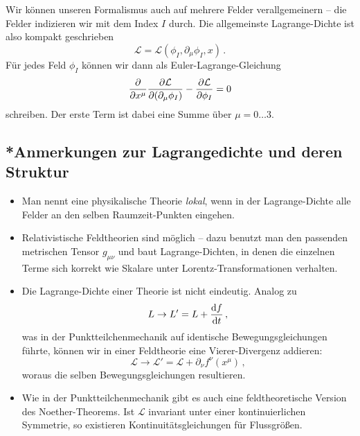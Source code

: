 \documentclass[paper=a4, fontsize=11.0pt, abstractoff, DIV12]{scrartcl}
\newcommand{\LD}{\ensuremath{\mathcal{L}}}
\begin{document}
Wir können unseren Formalismus auch auf mehrere Felder verallgemeinern --
die Felder indizieren wir mit dem Index $I$ durch. Die allgemeinste
Lagrange-Dichte ist also kompakt geschrieben
\begin{equation}
\LD = \LD(\phi_I, \partial_\mu\phi_I, x)\,.
\end{equation}
Für jedes Feld $\phi_I$ können wir dann als Euler-Lagrange-Gleichung
\begin{equation}
\firstpderiv{}{x^\mu}\firstpderiv{\LD}{(\partial_\mu\phi_I)} - \firstpderiv{\LD}{\phi_I} = 0
\end{equation}
schreiben. Der erste Term ist dabei eine Summe über $\mu = 0\dots3$.

\subsection{*Anmerkungen zur Lagrangedichte und deren Struktur}

\begin{itemize}
    \item Man nennt eine physikalische Theorie \emph{lokal}, wenn in der
    Lagrange-Dichte alle Felder an den selben Raumzeit-Punkten eingehen.

    \item Relativistische Feldtheorien sind möglich -- dazu benutzt man den
    passenden metrischen Tensor $g_{\mu\nu}$ und baut Lagrange-Dichten, in
    denen die einzelnen Terme sich korrekt wie Skalare unter
    Lorentz-Transformationen verhalten.

    \item Die Lagrange-Dichte einer Theorie ist nicht eindeutig. Analog zu
    \begin{equation}
    L \to L' = L + \frac{\mathrm{d}f}{\mathrm{d}t}\,,
    \end{equation}
    was in der Punktteilchenmechanik auf identische Bewegungsgleichungen
    führte, können wir in einer Feldtheorie eine Vierer-Divergenz addieren:
    \begin{equation}
    \LD \to \LD' = \LD + \partial_\nu f^\nu(x^\mu)\,,
    \end{equation}
    woraus die selben Bewegungsgleichungen resultieren.

    \item Wie in der Punktteilchenmechanik gibt es auch eine
    feldtheoretische Version des Noether-Theorems. Ist $\LD$ invariant unter
    einer kontinuierlichen Symmetrie, so existieren Kontinuitätsgleichungen
    für Flussgrößen.
\end{itemize}
\end{document}
